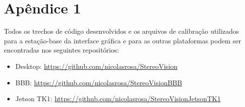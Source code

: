 \chapter{Apêndice 1}
\label{Apendice1}

Todos os trechos de código desenvolvidos e os arquivos de calibração utilizados para a estação-base da interface gráfica e para as outras plataformas podem ser encontradas nos seguintes repositórios:

\begin{itemize}
 \item Desktop: \url{https://github.com/nicolasrosa/StereoVision}
 \item BBB: \url{https://github.com/nicolasrosa/StereoVisionBBB}
 \item Jetson TK1: \url{https://github.com/nicolasrosa/StereoVisionJetsonTK1}
\end{itemize}
